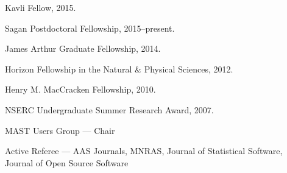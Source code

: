 \documentclass[12pt,letterpaper]{article}
\begin{document}
\begin{list}{}{\cvlist}

\item Kavli Fellow, 2015.
\item Sagan Postdoctoral Fellowship, 2015--present.
\item James Arthur Graduate Fellowship, 2014.
\item Horizon Fellowship in the Natural \& Physical Sciences, 2012.
\item Henry M. MacCracken Fellowship, 2010.
\item NSERC Undergraduate Summer Research Award, 2007.

\end{list}


\begin{list}{}{\cvlist}
\item MAST Users Group --- Chair
\item Active Referee ---
    AAS Journals,
    MNRAS,
    Journal of Statistical Software,
    Journal of Open Source Software
\end{list}
\end{document}
